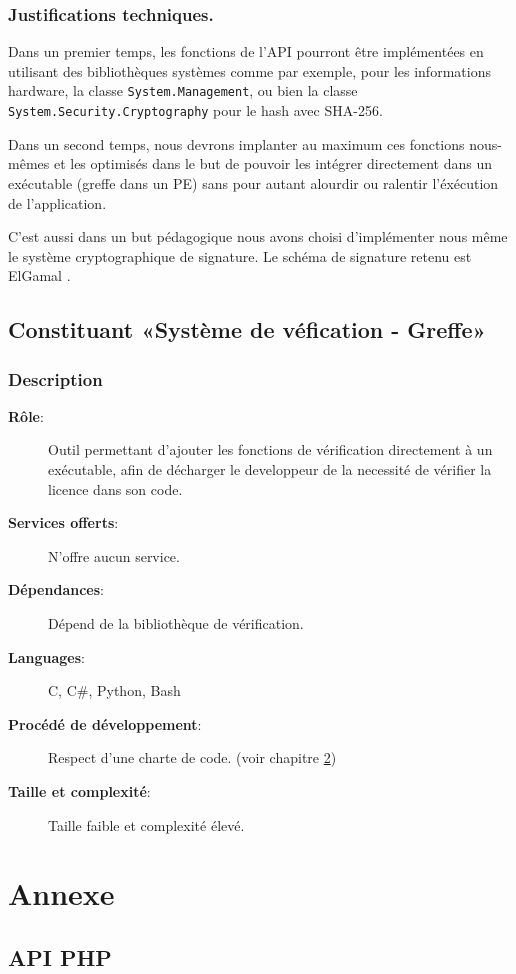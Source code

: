 \subsection{Justifications techniques.}
Dans un premier temps, les fonctions de l'API pourront être implémentées en utilisant des bibliothèques systèmes comme par exemple, pour les informations hardware, la classe \verb:System.Management:, ou bien la classe \verb:System.Security.Cryptography: pour le hash avec SHA-256.\newline

Dans un second temps, nous devrons implanter au maximum ces fonctions nous-mêmes et 
les optimisés dans le but de pouvoir les intégrer directement dans un 
exécutable (greffe dans un PE) sans pour autant alourdir ou ralentir l'éxécution de 
l'application. \newline

C'est aussi dans un but pédagogique nous avons choisi d'implémenter nous même le système cryptographique de signature. Le schéma de signature retenu est ElGamal \cite{ElGamal}.

\section{Constituant «Système de véfication - Greffe»}
\subsection{Description}
\begin{description}
	\item[\textbf{Rôle}:]
			Outil permettant d'ajouter les fonctions de vérification directement à un
			exécutable, afin de décharger le developpeur de la necessité de vérifier 
			la licence dans son code.
	\item[\textbf{Services offerts}:]
		N'offre aucun service.
	\item[\textbf{Dépendances}:]
		Dépend de la bibliothèque de vérification.
	\item[\textbf{Languages}:]
		C, C\#, Python, Bash 
	\item[\textbf{Procédé de développement}:]
		Respect d'une charte de code. (voir chapitre \ref{chap:Annexe}) 
	\item[\textbf{Taille et complexité}:]
		Taille faible et complexité élevé.
\end{description}


\chapter{Annexe}
\label{chap:Annexe}



\section{API PHP}
\label{section:php}
\inputminted{php}{api.php}
